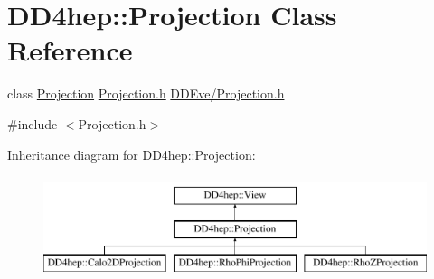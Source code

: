 \hypertarget{class_d_d4hep_1_1_projection}{}\section{D\+D4hep\+:\+:Projection Class Reference}
\label{class_d_d4hep_1_1_projection}


class \hyperlink{class_d_d4hep_1_1_projection}{Projection} \hyperlink{_projection_8h}{Projection.\+h} \hyperlink{_projection_8h}{D\+D\+Eve/\+Projection.\+h}  




{\ttfamily \#include $<$Projection.\+h$>$}

Inheritance diagram for D\+D4hep\+:\+:Projection\+:\begin{figure}[H]
\begin{center}
\leavevmode
\includegraphics[height=3.000000cm]{class_d_d4hep_1_1_projection}
\end{center}
\end{figure}
